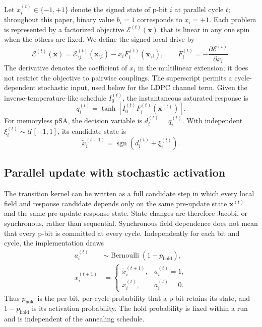 \documentclass[aps,prapplied,reprint,superscriptaddress,longbibliography,floatfix]{revtex4-2}
\newcommand{\psa}{pSA}
\newcommand{\sgn}{\operatorname{sgn}}
\begin{document}
Let $x_i^{(t)}\in\{-1,+1\}$ denote the signed state of p-bit $i$ at parallel cycle $t$; throughout this paper, binary value $b_i=1$ corresponds to $x_i=+1$.  Each problem is represented by a factorized objective $\mathcal{E}^{(t)}(\bm{x})$ that is linear in any one spin when the others are fixed.  We define the signed local drive by
\begin{equation}
\mathcal{E}^{(t)}(\bm{x})=
\mathcal{E}_{\setminus i}^{(t)}(\bm{x}_{\setminus i})
-x_i F_i^{(t)}(\bm{x}_{\setminus i}),
\qquad
F_i^{(t)}=-\frac{\partial \mathcal{E}^{(t)}}{\partial x_i}.
\label{eq:fielddefinition}
\end{equation}
The derivative denotes the coefficient of $x_i$ in the multilinear extension; it does not restrict the objective to pairwise couplings.  The superscript permits a cycle-dependent stochastic input, used below for the LDPC channel term.  Given the inverse-temperature-like schedule $I_0^{(t)}$, the instantaneous saturated response is
\begin{equation}
q_i^{(t)}=\tanh\!\left[I_0^{(t)}F_i^{(t)}(\bm{x}^{(t)})\right].
\label{eq:q}
\end{equation}
For memoryless \psa{}, the decision variable is $d_i^{(t)}=q_i^{(t)}$.  With independent $\xi_i^{(t)}\sim\mathcal{U}[-1,1]$, its candidate state is
\begin{equation}
\widetilde{x}_i^{(t+1)}=\sgn\!\left(d_i^{(t)}+\xi_i^{(t)}\right).
\label{eq:candidate}
\end{equation}

\subsection{Parallel update with stochastic activation}

The transition kernel can be written as a full candidate step in which every local field and response candidate depends only on the same pre-update state $\bm{x}^{(t)}$ and the same pre-update response state.  State changes are therefore Jacobi, or synchronous, rather than sequential.  Synchronous field dependence does not mean that every p-bit is committed at every cycle.  Independently for each bit and cycle, the implementation draws
\begin{align}
a_i^{(t)}&\sim\operatorname{Bernoulli}(1-p_{\mathrm{hold}}),
\label{eq:activationmask}\\
x_i^{(t+1)}&=
\begin{cases}
\widetilde{x}_i^{(t+1)}, & a_i^{(t)}=1,\\
x_i^{(t)}, & a_i^{(t)}=0.
\end{cases}
\label{eq:activation}
\end{align}
Thus $p_{\mathrm{hold}}$ is the per-bit, per-cycle probability that a p-bit retains its state, and $1-p_{\mathrm{hold}}$ is its activation probability.  The hold probability is fixed within a run and is independent of the annealing schedule.
\end{document}
